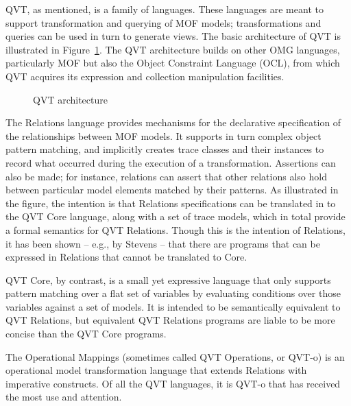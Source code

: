 QVT, as mentioned, is a family of languages. These languages are meant to support transformation and querying of MOF models; transformations and queries  can be used in turn to generate views. The basic architecture of QVT is illustrated in Figure~\ref{fig:qvt}. The QVT architecture builds on other OMG languages, particularly MOF but also the Object Constraint Language (OCL), from which QVT acquires its expression and collection manipulation facilities.

\begin{figure}[htbp]
\caption{QVT architecture \cite{QVT-specification}}
\label{fig:qvt}
\end{figure}

The Relations language provides mechanisms for the declarative specification of the relationships between MOF models. It supports in turn complex object pattern matching, and implicitly creates trace classes and their instances to record what occurred during the execution of a transformation. Assertions can also be made; for instance, relations can assert that other relations also hold between particular model elements matched by their patterns. As illustrated in the figure, the intention is that Relations specifications can be translated in to the QVT Core language, along with a set of trace models, which in total provide a formal semantics for QVT Relations. Though this is the intention of Relations, it has been shown -- e.g., by Stevens \cite{Stevens13} -- that there are programs that can be expressed in Relations that cannot be translated to Core.

QVT Core, by contrast, is a small yet expressive language that only supports pattern matching over a flat set of variables by evaluating conditions
over those variables against a set of models. It is intended to be semantically equivalent to QVT Relations, but equivalent QVT Relations programs are liable to be more concise than the QVT Core programs.

The Operational Mappings (sometimes called QVT Operations, or QVT-o) is an operational model transformation language that extends Relations with imperative constructs. Of all the QVT languages, it is QVT-o that has received the most use and attention.

